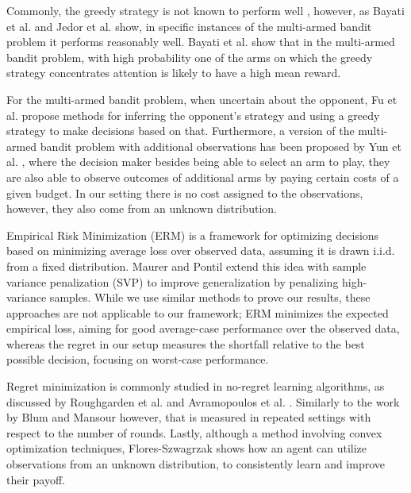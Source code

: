 Commonly, the greedy strategy is not known to perform well \cite{BGY2004, Wang2023}, however, as Bayati et al. \cite{BHJK} and Jedor et al. \cite{JLP2021} show, in specific instances of the multi-armed bandit problem it performs reasonably well. Bayati et al. \cite{BHJK} show that in the multi-armed bandit problem, with high probability one of the arms on which the greedy strategy concentrates attention is likely to have a high mean reward.

For the multi-armed bandit problem, when uncertain about the opponent, Fu et al. \cite{FTYLWXWLXFY2022} propose methods for inferring the opponent's strategy and using a greedy strategy to make decisions based on that. 
Furthermore, a version of the multi-armed bandit problem with additional observations has been proposed by Yun et al. \cite{YPASY2018}, where the decision maker besides being able to select an arm to play, they are also able to observe outcomes of additional arms by paying certain costs of a given budget. In our setting there is no cost assigned to the observations, however, they also come from an unknown distribution. 

Empirical Risk Minimization (ERM) is a framework for optimizing decisions based on minimizing average loss over observed data, assuming it is drawn i.i.d. from a fixed distribution. Maurer and Pontil \cite{MP2009} extend this idea with sample variance penalization (SVP) to improve generalization by penalizing high-variance samples. While we use similar methods to prove our results, these approaches are not applicable to our framework; ERM minimizes the expected empirical loss, aiming for good average-case performance over the observed data, whereas the regret in our setup measures the shortfall relative to the best possible decision, focusing on worst-case performance.

Regret minimization is commonly studied in no-regret learning algorithms, as discussed by Roughgarden et al. \cite{TN16} and Avramopoulos et al. \cite{ARS2008}. Similarly to the work by Blum and Mansour however, that is measured in repeated settings with respect to the number of rounds. Lastly, although a method involving convex optimization techniques, Flores-Szwagrzak \cite{Flores2022} shows how an agent can utilize observations from an unknown distribution, to consistently learn and improve their payoff.